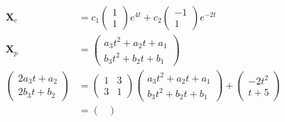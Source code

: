 \documentclass{article}
\begin{document}
\setcounter{subsubsection}{2}
\subsubsection{}

\begin{align*}
  \mathbf{X}_c     & = c_1 \begin{pmatrix}
                             1 \\
                             1
                           \end{pmatrix} e^{4 t} + c_2 \begin{pmatrix}
                                                         -1 \\
                                                         1
                                                       \end{pmatrix} e^{-2 t}                                                \\
  \mathbf{X}_p     & = \begin{pmatrix}
                         a_3 t^2 + a_2 t + a_1 \\
                         b_3 t^2 + b_2 t + b_1
                       \end{pmatrix}                                                                                 \\
  \begin{pmatrix}
    2 a_3 t + a_2 \\
    2 b_3 t + b_2
  \end{pmatrix} & = \begin{pmatrix}
                      1 & 3 \\
                      3 & 1
                    \end{pmatrix} \begin{pmatrix}
                                    a_3 t^2 + a_2 t + a_1 \\
                                    b_3 t^2 + b_2 t + b_1
                                  \end{pmatrix} + \begin{pmatrix}
                                                    -2 t^2 \\
                                                    t + 5
                                                  \end{pmatrix}                                                             \\
                   & = \begin{pmatrix}

\end{pmatrix}
\end{align*}
\end{document}
